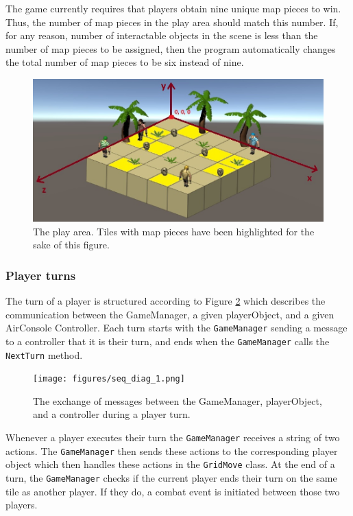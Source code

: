 The game currently requires that players obtain nine unique map pieces to win. Thus, the number of map pieces in the play area should match this number. If, for any reason, number of interactable objects in the scene is less than the number of map pieces to be assigned, then the program automatically changes the total number of map pieces to be six instead of nine.

\begin{figure}
	\centering
	\includegraphics[width=1\textwidth]{figures/mapFigure.jpg}
	\caption{The play area. Tiles with map pieces have been highlighted for the sake of this figure.\label{fig:playArea}}
\end{figure}

\subsubsection{Player turns}\label{sec:playerTurns}
The turn of a player is structured according to Figure \ref{fig:seqDiagram1} which describes the communication between the GameManager, a given playerObject, and a given AirConsole Controller. Each turn starts with the \texttt{GameManager} sending a message to a controller that it is their turn, and ends when the \texttt{GameManager} calls the \texttt{NextTurn} method. 

\begin{figure}
	\centering	
	\texttt{[image: figures/seq\_diag\_1.png]}
	\caption{The exchange of messages between the GameManager, playerObject, and a controller during a player turn.\label{fig:seqDiagram1}}
\end{figure}

Whenever a player executes their turn the \texttt{GameManager} receives a string of two actions. The \texttt{GameManager} then sends these actions to the corresponding player object which then handles these actions in the \texttt{GridMove} class. At the end of a turn, the \texttt{GameManager} checks if the current player ends their turn on the same tile as another player. If they do, a combat event is initiated between those two players.

